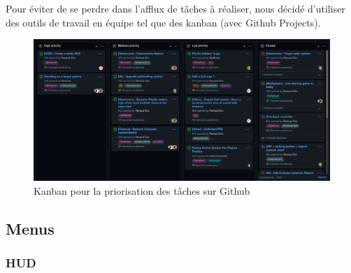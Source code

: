 \documentclass[french, 12pt]{article}
\begin{document}
    Pour éviter de se perdre dans l'afflux de tâches à réaliser, nous décidé d'utiliser des
    outils de travail en équipe tel que des kanban (avec Github Projects).\\
    

    \begin{figure}[hbt!]
        \centering
        \includegraphics[scale=0.28]{kanban.png}
        \caption{Kanban pour la priorisation des tâches sur Github}
    \end{figure}


    
    
    \newpage

    



    

    
    \subsection{Menus}

        \subsubsection{HUD}
\end{document}
